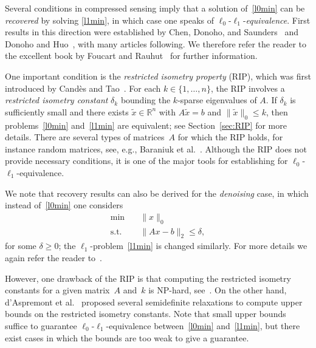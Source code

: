 \documentclass[a4paper,11pt,1p]{elsarticle}
\newcommand{\Norm}[2]{\lVert{#1}\rVert_{#2}}
\newcommand{\R}{\mathds{R}}
\begin{document}
%


Several conditions in compressed sensing imply that a solution
of~\eqref{l0min} can be \emph{recovered} by solving \eqref{l1min}, in which
case one speaks of $\ell_0$-$\ell_1$-\emph{equivalence}. First results in
this direction were established by Chen, Donoho, and
Saunders~\cite{CheDS99} and Donoho and Huo~\cite{DH01}, with many articles
following. We therefore refer the reader to the excellent book by Foucart
and Rauhut~\cite{FouR13} for further information.

One important condition is the \emph{restricted isometry property} (RIP),
which was first introduced by Cand\`es and Tao~\cite{CT05}. For each $k \in
\{1, \dots, n\}$, the RIP involves a \emph{restricted isometry constant}
$\delta_k$ bounding the $k$-sparse eigenvalues of $A$. If $\delta_k$ is sufficiently small
and there exists $\tilde{x} \in \R^n$ with $A \tilde{x} = b$ and
$\Norm{\tilde{x}}{0} \leq k$, then problems~\eqref{l0min} and~\eqref{l1min}
are equivalent; see Section~\ref{sec:RIP} for more details. There are
several types of matrices~$A$ for which the RIP holds, for instance random
matrices, see, e.g., Baraniuk et al.~\cite{BDDW08}. Although the RIP does
not provide necessary conditions, it is one of the major tools for
establishing for $\ell_0$-$\ell_1$-equivalence.

We note that recovery results can also be derived for the \emph{denoising}
case, in which instead of~\eqref{l0min} one considers
\begin{align}\label{l0minDenoising}
  \min \quad & \Norm{x}{0} \tag{$P_0^\delta$}\\
  \text{s.t.} \quad & \Norm{Ax - b}{2} \leq \delta, \nonumber
\end{align}
for some $\delta \geq 0$; the $\ell_1$-problem~\eqref{l1min} is changed
similarly. For more details we again refer the reader to~\cite{FouR13}.

However, one drawback of the RIP is that computing the restricted isometry
constants for a given matrix~$A$ and~$k$ is NP-hard, see~\cite{PT14}. On
the other hand, d'Aspremont et al.~\cite{Asp07,Asp08} proposed several
semidefinite relaxations to compute upper bounds on the restricted isometry
constants. Note that small upper bounds suffice to guarantee
$\ell_0$-$\ell_1$-equivalence between~\eqref{l0min} and~\eqref{l1min}, but
there exist cases in which the bounds are too weak to give a guarantee.
\end{document}
